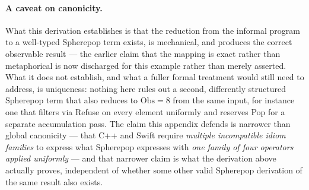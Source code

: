 \documentclass[11pt]{article}
\begin{document}
\paragraph{A caveat on canonicity.} What this derivation establishes is that the reduction from the informal program to a well-typed Spherepop term exists, is mechanical, and produces the correct observable result --- the earlier claim that the mapping is exact rather than metaphorical is now discharged for this example rather than merely asserted. What it does not establish, and what a fuller formal treatment would still need to address, is uniqueness: nothing here rules out a second, differently structured Spherepop term that also reduces to $\mathrm{Obs} = 8$ from the same input, for instance one that filters via Refuse on every element uniformly and reserves Pop for a separate accumulation pass. The claim this appendix defends is narrower than global canonicity --- that C++ and Swift require \emph{multiple incompatible idiom families} to express what Spherepop expresses with \emph{one family of four operators applied uniformly} --- and that narrower claim is what the derivation above actually proves, independent of whether some other valid Spherepop derivation of the same result also exists.
\end{document}
